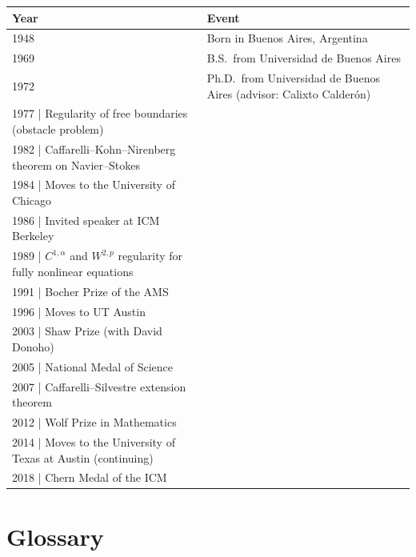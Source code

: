 \begin{tabularx}{\linewidth}{|p{1.5cm}|>{\raggedright\arraybackslash}X|}
\hline
\textbf{Year} & \textbf{Event} \\ \hline
1948 & Born in Buenos Aires, Argentina \\ \hline
1969 & B.S.\ from Universidad de Buenos Aires \\ \hline
1972 & Ph.D.\ from Universidad de Buenos Aires (advisor: Calixto Calder\'on) \\ \hline
1977 | Regularity of free boundaries (obstacle problem) \\ \hline
1982 | Caffarelli--Kohn--Nirenberg theorem on Navier--Stokes \\ \hline
1984 | Moves to the University of Chicago \\ \hline
1986 | Invited speaker at ICM Berkeley \\ \hline
1989 | $C^{1,\alpha}$ and $W^{2,p}$ regularity for fully nonlinear equations \\ \hline
1991 | Bocher Prize of the AMS \\ \hline
1996 | Moves to UT Austin \\ \hline
2003 | Shaw Prize (with David Donoho) \\ \hline
2005 | National Medal of Science \\ \hline
2007 | Caffarelli--Silvestre extension theorem \\ \hline
2012 | Wolf Prize in Mathematics \\ \hline
2014 | Moves to the University of Texas at Austin (continuing) \\ \hline
2018 | Chern Medal of the ICM \\
\hline
\end{tabularx}

\section*{Glossary}


